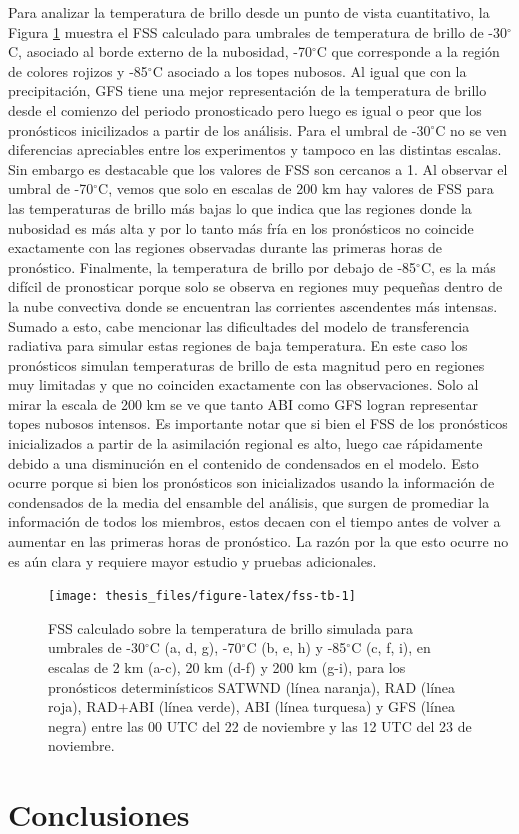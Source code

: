 \documentclass[12pt,oneside,a4paper]{reedthesis}
\begin{document}
Para analizar la temperatura de brillo desde un punto de vista cuantitativo, la Figura \ref{fig:fss-tb} muestra el FSS calculado para umbrales de temperatura de brillo de -30\(^\circ\)C, asociado al borde externo de la nubosidad, -70\(^\circ\)C que corresponde a la región de colores rojizos y -85\(^\circ\)C asociado a los topes nubosos. Al igual que con la precipitación, GFS tiene una mejor representación de la temperatura de brillo desde el comienzo del periodo pronosticado pero luego es igual o peor que los pronósticos inicilizados a partir de los análisis. Para el umbral de -30\(^\circ\)C no se ven diferencias apreciables entre los experimentos y tampoco en las distintas escalas. Sin embargo es destacable que los valores de FSS son cercanos a 1. Al observar el umbral de -70\(^\circ\)C, vemos que solo en escalas de 200 km hay valores de FSS para las temperaturas de brillo más bajas lo que indica que las regiones donde la nubosidad es más alta y por lo tanto más fría en los pronósticos no coincide exactamente con las regiones observadas durante las primeras horas de pronóstico. Finalmente, la temperatura de brillo por debajo de -85\(^\circ\)C, es la más difícil de pronosticar porque solo se observa en regiones muy pequeñas dentro de la nube convectiva donde se encuentran las corrientes ascendentes más intensas. Sumado a esto, cabe mencionar las dificultades del modelo de transferencia radiativa para simular estas regiones de baja temperatura. En este caso los pronósticos simulan temperaturas de brillo de esta magnitud pero en regiones muy limitadas y que no coinciden exactamente con las observaciones. Solo al mirar la escala de 200 km se ve que tanto ABI como GFS logran representar topes nubosos intensos. Es importante notar que si bien el FSS de los pronósticos inicializados a partir de la asimilación regional es alto, luego cae rápidamente debido a una disminución en el contenido de condensados en el modelo. Esto ocurre porque si bien los pronósticos son inicializados usando la información de condensados de la media del ensamble del análisis, que surgen de promediar la información de todos los miembros, estos decaen con el tiempo antes de volver a aumentar en las primeras horas de pronóstico. La razón por la que esto ocurre no es aún clara y requiere mayor estudio y pruebas adicionales.


\begin{figure}
\texttt{[image: thesis\_files/figure-latex/fss-tb-1]} \caption{FSS calculado sobre la temperatura de brillo simulada para umbrales de -30\(^\circ\)C (a, d, g), -70\(^\circ\)C (b, e, h) y -85\(^\circ\)C (c, f, i), en escalas de 2 km (a-c), 20 km (d-f) y 200 km (g-i), para los pronósticos determinísticos SATWND (línea naranja), RAD (línea roja), RAD+ABI (línea verde), ABI (línea turquesa) y GFS (línea negra) entre las 00 UTC del 22 de noviembre y las 12 UTC del 23 de noviembre.}\label{fig:fss-tb}
\end{figure}
\hypertarget{conclusiones-2}{%
\section{Conclusiones}\label{conclusiones-2}}
\end{document}
